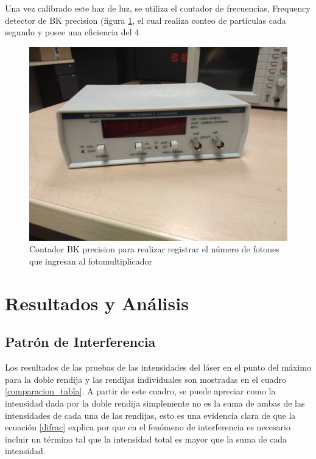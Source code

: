 \documentclass[%
 reprint,
 amsmath,amssymb,
 aps,
]{revtex4-1}
\begin{document}
Una vez calibrado este haz de luz, se utiliza el contador de frecuencias, Frequency detector de BK precision (figura \ref{contador}, el cual realiza conteo de partículas cada segundo y posee una eficiencia del 4{%

\begin{figure}
    \centering
    \includegraphics[scale=0.1]{Double_Slit/Figuras/Contador.jpg}
    \caption{Contador BK precision para realizar registrar el número de fotones que ingresan al fotomultiplicador}
    \label{contador}
\end{figure}

\section{Resultados y Análisis}
\subsection{Patrón de Interferencia}
Los resultados de las pruebas de las intensidades del láser en el punto del máximo para la doble rendija y las rendijas individuales son mostradas en el cuadro \ref{comparacion_tabla}. A partir de este cuadro, se puede apreciar como la intensidad dada por la doble rendija simplemente no es la suma de ambas de las intensidades de cada una de las rendijas, esto es una evidencia clara de que la ecuación \eqref{difrac} explica por que en el fenómeno de interferencia es necesario incluir un término tal que la intensidad total es mayor que la suma de cada intensidad.


}
\end{document}
